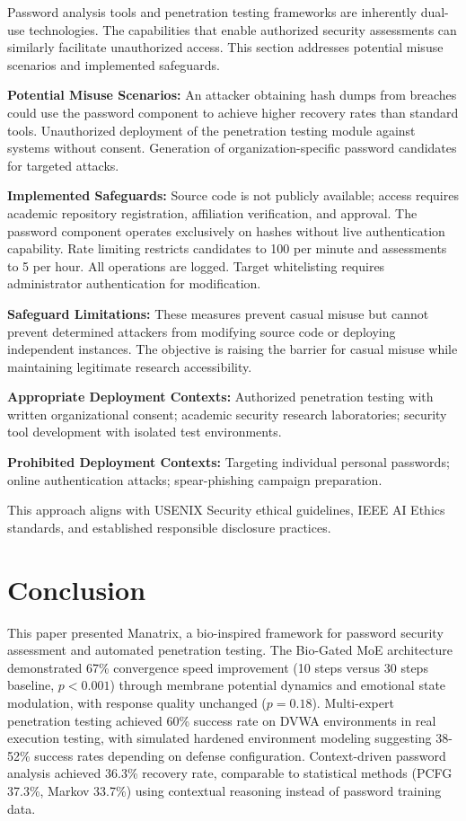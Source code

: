 \documentclass[preprint,12pt]{elsarticle}
\begin{document}
Password analysis tools and penetration testing frameworks are inherently dual-use technologies. The capabilities that enable authorized security assessments can similarly facilitate unauthorized access. This section addresses potential misuse scenarios and implemented safeguards.

\textbf{Potential Misuse Scenarios:} An attacker obtaining hash dumps from breaches could use the password component to achieve higher recovery rates than standard tools. Unauthorized deployment of the penetration testing module against systems without consent. Generation of organization-specific password candidates for targeted attacks.

\textbf{Implemented Safeguards:} Source code is not publicly available; access requires academic repository registration, affiliation verification, and approval. The password component operates exclusively on hashes without live authentication capability. Rate limiting restricts candidates to 100 per minute and assessments to 5 per hour. All operations are logged. Target whitelisting requires administrator authentication for modification.

\textbf{Safeguard Limitations:} These measures prevent casual misuse but cannot prevent determined attackers from modifying source code or deploying independent instances. The objective is raising the barrier for casual misuse while maintaining legitimate research accessibility.

\textbf{Appropriate Deployment Contexts:} Authorized penetration testing with written organizational consent; academic security research laboratories; security tool development with isolated test environments.

\textbf{Prohibited Deployment Contexts:} Targeting individual personal passwords; online authentication attacks; spear-phishing campaign preparation.

This approach aligns with USENIX Security ethical guidelines, IEEE AI Ethics standards, and established responsible disclosure practices.

\section{Conclusion}
\label{sec:conclusion}

This paper presented Manatrix, a bio-inspired framework for password security assessment and automated penetration testing. The Bio-Gated MoE architecture demonstrated 67\% convergence speed improvement (10 steps versus 30 steps baseline, $p<0.001$) through membrane potential dynamics and emotional state modulation, with response quality unchanged ($p=0.18$). Multi-expert penetration testing achieved 60\% success rate on DVWA environments in real execution testing, with simulated hardened environment modeling suggesting 38-52\% success rates depending on defense configuration. Context-driven password analysis achieved 36.3\% recovery rate, comparable to statistical methods (PCFG 37.3\%, Markov 33.7\%) using contextual reasoning instead of password training data.
\end{document}
